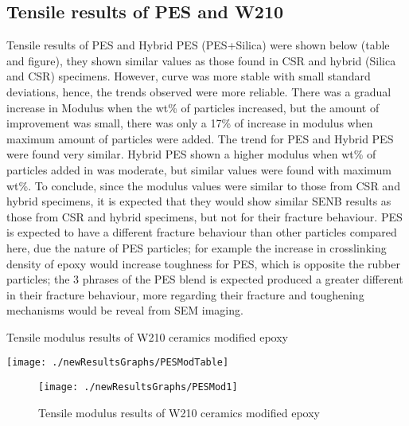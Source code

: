 \documentclass[numbers=noendperiod,chapterprefix=on]{icldt} %
\begin{document}
\subsection{Tensile results of PES and W210}
Tensile results of PES and Hybrid PES (PES+Silica) were shown below (table and figure), they shown similar values as those found in CSR and hybrid (Silica and CSR) specimens. However, curve was more stable with small standard deviations, hence, the trends observed were more reliable. There was a gradual increase in Modulus when the wt\% of particles increased, but the amount of improvement was small, there was only a 17\% of increase in modulus when maximum amount of particles were added. The trend for PES and Hybrid PES were found very similar. Hybrid PES shown a higher modulus when wt\% of particles added in was moderate, but similar values were found with maximum wt\%. To conclude, since the modulus values were similar to those from CSR and hybrid specimens, it is expected that they would show similar SENB results as those from CSR and hybrid specimens, but not for their fracture behaviour. PES is expected to have a different fracture behaviour than other particles compared here, due the nature of PES particles; for example the increase in crosslinking density of epoxy would increase toughness for PES, which is opposite the rubber particles; the 3 phrases of the PES blend is expected produced a greater different in their fracture behaviour, more regarding their fracture and toughening mechanisms would be reveal from SEM imaging.

\begin{table}[!htpb]
\centering
\caption{Tensile modulus results of W210 ceramics modified epoxy} %
\texttt{[image: ./newResultsGraphs/PESModTable]}
\end{table}
\FloatBarrier

\begin{figure}[!hp]
\centering
\texttt{[image: ./newResultsGraphs/PESMod1]}
\caption{Tensile modulus results of W210 ceramics modified epoxy}
\end{figure}
\FloatBarrier
\end{document}
